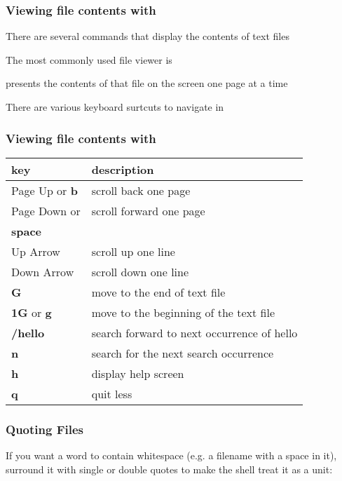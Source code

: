 \documentclass[12pt]{beamer}\usepackage[]{graphicx}\usepackage[]{color}
\begin{document}
\begin{frame}
\frametitle{Viewing file contents with }
\bi
  \item There are several commands that display the contents of text files
  \item The most commonly used file viewer is {\hilit {}}
  \item {} presents the contents of that file on the screen one page at a time
  \item There are various keyboard surtcuts to navigate in 
\ei
\end{frame}


\begin{frame}
\frametitle{Viewing file contents with }
{\small
\begin{center}
 \begin{tabular}{l l}
  \hline
   key & description \\
  \hline
  Page Up or \textbf{b} & scroll back one page \\
  Page Down or & scroll forward one page \\
  \textbf{space} & \\
  Up Arrow & scroll up one line \\  
  Down Arrow & scroll down one line \\
  \textbf{G} & move to the end of text file \\  
  \textbf{1G} or \textbf{g} & move to the beginning of the text file \\
  \textbf{/hello} & search forward to next occurrence of hello \\
  \textbf{n} & search for the next search occurrence \\
  \textbf{h} & display help screen \\
  \textbf{q} & quit less \\
  \hline
 \end{tabular}
\end{center}
}
\end{frame}


\begin{frame}
\frametitle{Quoting Files}
If you want a word to contain whitespace (e.g. a filename with a space in it), surround it with single or double quotes to make the shell treat it as a unit: \\
\end{frame}
\end{document}
